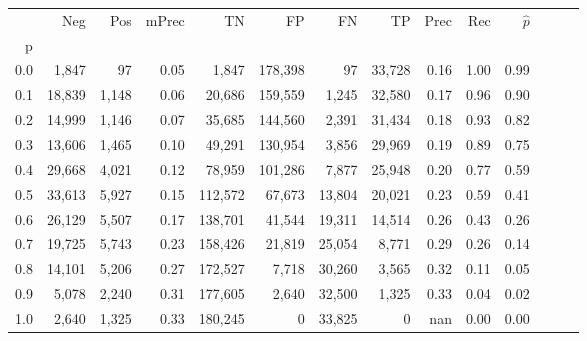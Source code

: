 \begin{tabular}{rrrrrrrrrrrrrr}
\toprule
{} &     Neg &    Pos & mPrec &       TN &       FP &      FN &      TP &  Prec &   Rec & $\hat{p}$ \\
p   &         &        &       &          &          &         &         &       &       &           \\
\midrule
0.0 &   1,847 &     97 &  0.05 &    1,847 &  178,398 &      97 &  33,728 &  0.16 &  1.00 &      0.99 \\
0.1 &  18,839 &  1,148 &  0.06 &   20,686 &  159,559 &   1,245 &  32,580 &  0.17 &  0.96 &      0.90 \\
0.2 &  14,999 &  1,146 &  0.07 &   35,685 &  144,560 &   2,391 &  31,434 &  0.18 &  0.93 &      0.82 \\
0.3 &  13,606 &  1,465 &  0.10 &   49,291 &  130,954 &   3,856 &  29,969 &  0.19 &  0.89 &      0.75 \\
0.4 &  29,668 &  4,021 &  0.12 &   78,959 &  101,286 &   7,877 &  25,948 &  0.20 &  0.77 &      0.59 \\
0.5 &  33,613 &  5,927 &  0.15 &  112,572 &   67,673 &  13,804 &  20,021 &  0.23 &  0.59 &      0.41 \\
0.6 &  26,129 &  5,507 &  0.17 &  138,701 &   41,544 &  19,311 &  14,514 &  0.26 &  0.43 &      0.26 \\
0.7 &  19,725 &  5,743 &  0.23 &  158,426 &   21,819 &  25,054 &   8,771 &  0.29 &  0.26 &      0.14 \\
0.8 &  14,101 &  5,206 &  0.27 &  172,527 &    7,718 &  30,260 &   3,565 &  0.32 &  0.11 &      0.05 \\
0.9 &   5,078 &  2,240 &  0.31 &  177,605 &    2,640 &  32,500 &   1,325 &  0.33 &  0.04 &      0.02 \\
1.0 &   2,640 &  1,325 &  0.33 &  180,245 &        0 &  33,825 &       0 &   nan &  0.00 &      0.00 \\
\bottomrule
\end{tabular}
